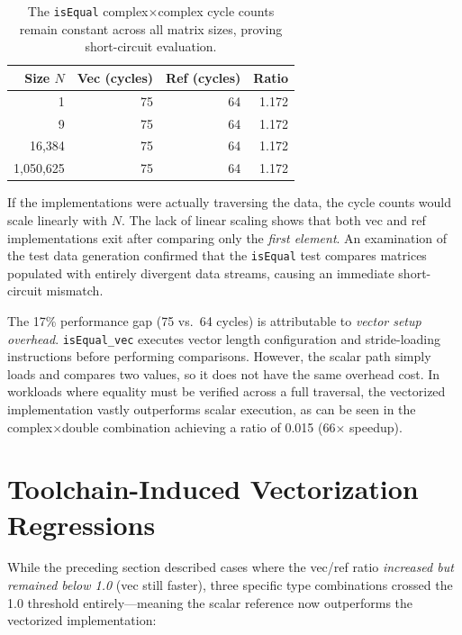 \begin{table}[H]
\centering
\caption{The \texttt{isEqual} complex$\times$complex cycle counts remain constant across all matrix sizes, proving short-circuit evaluation.}
\label{tab:isequal-evidence}
\small
\begin{tabular}{r r r r}
\toprule
Size $N$ & Vec (cycles) & Ref (cycles) & Ratio \\
\midrule
1 & 75 & 64 & 1.172 \\
9 & 75 & 64 & 1.172 \\
16,384 & 75 & 64 & 1.172 \\
1,050,625 & 75 & 64 & 1.172 \\
\bottomrule
\end{tabular}
\end{table}

If the implementations were actually traversing the data, the cycle counts would scale linearly with $N$. The lack of linear scaling shows that both vec and ref implementations exit after comparing only the \emph{first element}. An examination of the test data generation confirmed that the \texttt{isEqual} test compares matrices populated with entirely divergent data streams, causing an immediate short-circuit mismatch.

The 17\% performance gap (75 vs.\ 64 cycles) is attributable to \emph{vector setup overhead}. \texttt{isEqual\_vec} executes vector length configuration and stride-loading instructions before performing comparisons. However, the scalar path simply loads and compares two values, so it does not have the same overhead cost. In workloads where equality must be verified across a full traversal, the vectorized implementation vastly outperforms scalar execution, as can be seen in the complex$\times$double combination achieving a ratio of 0.015 (66$\times$ speedup).

\section{Toolchain-Induced Vectorization Regressions}

While the preceding section described cases where the vec/ref ratio \emph{increased but remained below 1.0} (vec still faster), three specific type combinations crossed the 1.0 threshold entirely---meaning the scalar reference now outperforms the vectorized implementation:

